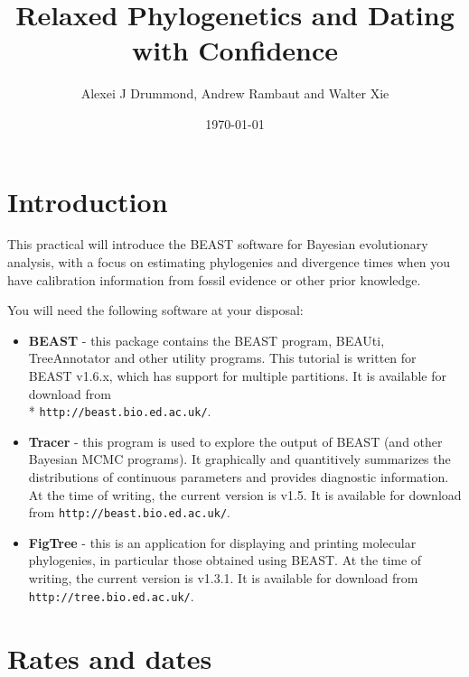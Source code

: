 \documentclass[12pt]{article}
\begin{document}
\title{Relaxed Phylogenetics and Dating with Confidence}

\author{Alexei J Drummond, Andrew Rambaut and Walter Xie}

\date{\today{}}

\maketitle

\section*{Introduction}

This practical will introduce the BEAST software for Bayesian evolutionary analysis, with a focus on estimating phylogenies and divergence times when you have calibration information from fossil evidence or other prior knowledge. 

You will need the following software at your disposal:

\begin{itemize}

\item {\bf BEAST} - this package contains the BEAST program, BEAUti, TreeAnnotator and other utility programs. This tutorial is written for BEAST v1.6.x, which has support for multiple partitions. It is available for download from \\* \texttt{http://beast.bio.ed.ac.uk/}.
\item {\bf Tracer} - this program is used to explore the output of BEAST (and other Bayesian MCMC programs). It graphically and
quantitively summarizes the distributions of continuous parameters and provides diagnostic information. At the time of
writing, the current version is v1.5. It is available for download from \texttt{http://beast.bio.ed.ac.uk/}.
\item {\bf FigTree} - this is an application for displaying and printing molecular phylogenies, in particular those obtained using
BEAST. At the time of writing, the current version is v1.3.1. It is available for download from \texttt{http://tree.bio.ed.ac.uk/}.
\end{itemize}


\section*{Rates and dates}
\end{document}
